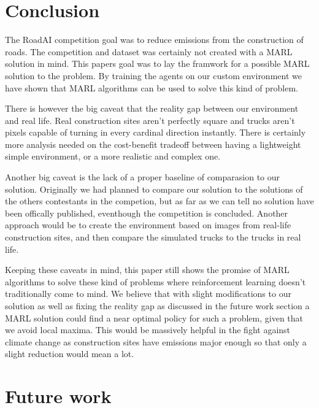 \documentclass[conference]{IEEEtran}
\begin{document}
	\section{Conclusion}

	The RoadAI competition goal was to reduce \coo{} emissions from the construction of roads.
	The competition and dataset was certainly not created with a MARL solution in mind.
	This papers goal was to lay the framwork for a possible MARL solution to the problem.
	By training the agents on our custom environment we have shown that MARL algorithms can be used to solve
	this  kind of problem.

	There is however the big caveat that the reality gap between our environment and real life.
	Real construction sites aren't perfectly square and trucks aren't pixels capable of turning in every
	cardinal direction instantly. There is certainly more analysis needed on the cost-benefit tradeoff
	between having a lightweight simple environment, or a more realistic and complex one.

	Another big caveat is the lack of a proper baseline of comparasion to our solution.
	Originally we had planned to compare our solution to the solutions of the others contestants in the
	competion, but as far as we can tell no solution have been offically published, eventhough the competition
	is concluded. Another approach would be to create the environment based on images from real-life
	construction sites, and then compare the simulated trucks to the trucks in real life.

	Keeping these caveats in mind, this paper still shows the promise of MARL algorithms to solve these kind of
	problems where reinforcement learning doesn't traditionally come to mind. We believe that with slight modifications to our solution as well as fixing the reality gap as discussed in the future work section a MARL solution could find a near optimal policy for such a problem, given that we avoid local maxima. This would be massively helpful in the fight against climate change as construction sites have emissions major enough so that only a slight reduction would mean a lot.


	\section{Future work}
\end{document}
